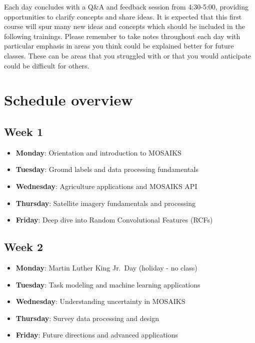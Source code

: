 \documentclass[
  letterpaper,
  DIV=11,
  numbers=noendperiod]{scrreprt}
\providecommand{\tightlist}{%
  \setlength{\itemsep}{0pt}\setlength{\parskip}{0pt}}\usepackage{longtable,booktabs,array}
\begin{document}
Each day concludes with a Q\&A and feedback session from 4:30-5:00,
providing opportunities to clarify concepts and share ideas. It is
expected that this first course will spur many new ideas and concepts
which should be included in the following trainings. Please remember to
take notes throughout each day with particular emphasis in areas you
think could be explained better for future classes. These can be areas
that you struggled with or that you would anticipate could be difficult
for others.

\hypertarget{schedule-overview}{%
\section*{Schedule overview}\label{schedule-overview}}


\hypertarget{week-1}{%
\subsection*{Week 1}\label{week-1}}

\begin{itemize}
\tightlist
\item
  \textbf{Monday}: Orientation and introduction to MOSAIKS
\item
  \textbf{Tuesday}: Ground labels and data processing fundamentals
\item
  \textbf{Wednesday}: Agriculture applications and MOSAIKS API
\item
  \textbf{Thursday}: Satellite imagery fundamentals and processing
\item
  \textbf{Friday}: Deep dive into Random Convolutional Features (RCFs)
\end{itemize}

\hypertarget{week-2}{%
\subsection*{Week 2}\label{week-2}}

\begin{itemize}
\tightlist
\item
  \textbf{Monday}: Martin Luther King Jr.~Day (holiday - no class)
\item
  \textbf{Tuesday}: Task modeling and machine learning applications
\item
  \textbf{Wednesday}: Understanding uncertainty in MOSAIKS
\item
  \textbf{Thursday}: Survey data processing and design
\item
  \textbf{Friday}: Future directions and advanced applications
\end{itemize}
\end{document}
